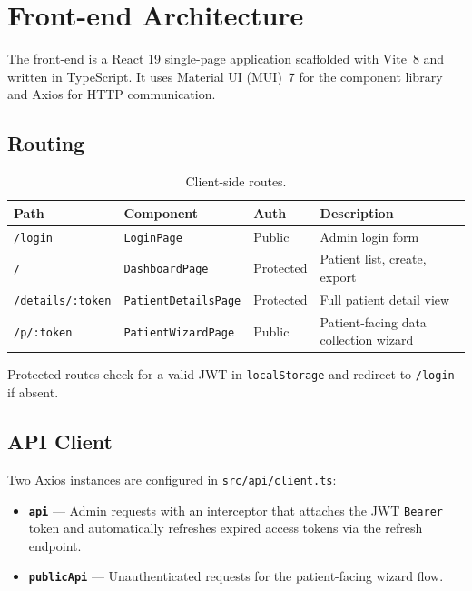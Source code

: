 \documentclass[12pt,a4paper]{article}
\begin{document}
\section{Front-end Architecture}
\label{sec:frontend}

The front-end is a React 19 single-page application scaffolded with Vite~8 and
written in TypeScript. It uses Material UI (MUI)~7 for the component library and
Axios for HTTP communication.

\subsection{Routing}

\begin{table}[H]
\centering
\caption{Client-side routes.}
\label{tab:routes}
\begin{tabularx}{\textwidth}{l l l X}
\toprule
\textbf{Path} & \textbf{Component} & \textbf{Auth} & \textbf{Description} \\
\midrule
\texttt{/login}           & \texttt{LoginPage}          & Public    & Admin login form \\
\texttt{/}                & \texttt{DashboardPage}      & Protected & Patient list, create, export \\
\texttt{/details/:token}  & \texttt{PatientDetailsPage} & Protected & Full patient detail view \\
\texttt{/p/:token}        & \texttt{PatientWizardPage}  & Public    & Patient-facing data collection wizard \\
\bottomrule
\end{tabularx}
\end{table}

Protected routes check for a valid JWT in \texttt{localStorage} and redirect to
\texttt{/login} if absent.

\subsection{API Client}

Two Axios instances are configured in \texttt{src/api/client.ts}:

\begin{itemize}[nosep]
  \item \textbf{\texttt{api}} --- Admin requests with an interceptor that
    attaches the JWT \texttt{Bearer} token and automatically refreshes expired
    access tokens via the refresh endpoint.
  \item \textbf{\texttt{publicApi}} --- Unauthenticated requests for the
    patient-facing wizard flow.
\end{itemize}
\end{document}

